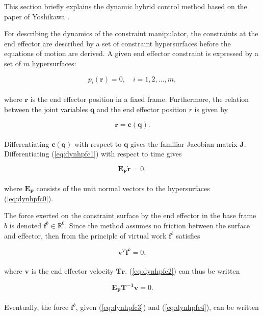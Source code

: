 This section briefly explains the dynamic hybrid control method based on the paper of Yoshikawa \cite{yoshikawa1987dynamic}. 

For describing the dynamics of the constraint manipulator, the constraints at the end effector are described by a set of constraint hypersurfaces before the equations of motion are derived. A given end effector constraint is expressed by a set of $m$ hypersurfaces:

\begin{equation}\label{eq:dynhpfc0}
    p_i(\mathbf{r}) = 0, \quad i = 1, 2, ..., m,
\end{equation}
\\
where $\mathbf{r}$ is the end effector position in a fixed frame. Furthermore, the relation between the joint variables $\mathbf{q}$ and the end effector position $r$ is given by

\begin{equation}\label{eq:dynhpfc1}
    \mathbf{r = c(q)}.
\end{equation}
\\
Differentiating $\mathbf{c(q)}$ with respect to $\mathbf{q}$ gives the familiar Jacobian matrix $\mathbf{J}$.
Differentiating (\ref{eq:dynhpfc1}) with respect to time gives

\begin{equation}\label{eq:dynhpfc2}
    \mathbf{E_F \dot{r}} = 0,
\end{equation}
\\
where $\mathbf{E_F}$ consists of the unit normal vectors to the hypersurfaces (\ref{eq:dynhpfc0}).

The force exerted on the constraint surface by the end effector in the base frame $b$ is denoted $\mathbf{f}^b \in \mathbb{R}^6$. Since the method assumes no friction between the surface and effector, then from the principle of virtual work $\mathbf{f}^b$ satisfies

\begin{equation}\label{eq:dynhpfc3}
    \mathbf{v}^T \mathbf{f}^b = 0,
\end{equation}
\\
where $\mathbf{v}$ is the end effector velocity $\mathbf{T\dot{r}}$. (\ref{eq:dynhpfc2}) can thus be written

\begin{equation}\label{eq:dynhpfc4}
    \mathbf{E_F T^{-1} v} = 0.    
\end{equation}
\\
Eventually, the force $\mathbf{f}^b$, given (\ref{eq:dynhpfc3}) and (\ref{eq:dynhpfc4}), can be written 

